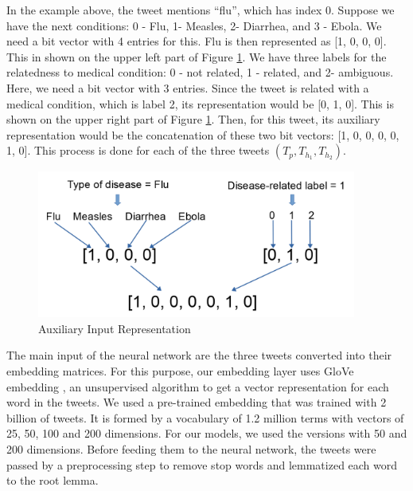 \documentclass[12pt]{report}
\begin{document}
In the example above, the tweet mentions ``flu'', which has index 0. Suppose we have the next conditions: 0 - Flu, 1- Measles, 2- Diarrhea, and  3 - Ebola.  
We  need a bit vector with 4 entries for this. Flu is then represented 
as [1, 0, 0, 0].  This in shown on the upper left part of  Figure \ref{figure:categorical}. We have three labels for the relatedness to medical condition: 0 - not related, 1 - related, and 2- ambiguous. Here, we need a bit vector with 3 entries. Since the tweet is related with a medical condition, which is label 2, its representation 
would be [0, 1, 0]. This is shown on the upper right part of  Figure \ref{figure:categorical}. Then, for this tweet, its auxiliary representation would be the concatenation of these two bit vectors: [1, 0, 0, 0, 0, 1, 0]. This process is done
for each of the three tweets $(T_p, T_{h_1},T_{h_2})$.

\begin{figure}[H]	
	\centering
	\includegraphics[width=105mm, scale = 1]{images/10_categorical.png}	
	\caption{Auxiliary Input Representation}	
	\label{figure:categorical}
\end{figure}


The main input of the neural network are the three tweets converted into their embedding matrices. For this purpose, our embedding layer uses GloVe embedding \cite{Pennington2014}, an unsupervised algorithm to get a vector representation for each word in the tweets. We used a pre-trained embedding that was trained with 2 billion of tweets. It is formed by a vocabulary of 1.2 million  terms with vectors of 25, 50, 100 and 200 dimensions. For our  models, we used the versions 
with 50 and 200 dimensions. Before feeding them to the neural network, the tweets were passed by a preprocessing step to remove stop words and lemmatized each word to the root lemma.
\end{document}
